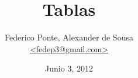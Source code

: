 \documentclass[11pt,fleqn]{article}
\begin{document}
\title{Tablas}
\author{Federico Ponte, Alexander de Sousa\\
\href{mailto:fedep3@gmail.com}{<fedep3@gmail.com>}}

\date{Junio 3, 2012}
\maketitle
























\end{document}
